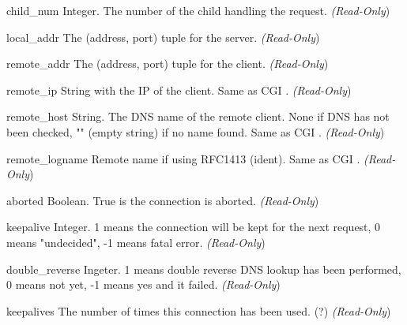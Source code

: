 \begin{memberdesc}[connection]{child_num}
Integer. The number of the child handling the request.
\emph{(Read-Only})
\end{memberdesc}

\begin{memberdesc}[connection]{local_addr}
The (address, port) tuple for the server.
\emph{(Read-Only})
\end{memberdesc}

\begin{memberdesc}[connection]{remote_addr}
The (address, port) tuple for the client.
\emph{(Read-Only})
\end{memberdesc}

\begin{memberdesc}[connection]{remote_ip}
String with the IP of the client. Same as CGI .
\emph{(Read-Only})
\end{memberdesc}

\begin{memberdesc}[connection]{remote_host}
String. The DNS name of the remote client. None if DNS has not been
checked, "" (empty string) if no name found. Same as CGI .
\emph{(Read-Only})
\end{memberdesc}

\begin{memberdesc}[connection]{remote_logname}
Remote name if using RFC1413 (ident). Same as CGI .
\emph{(Read-Only})
\end{memberdesc}

\begin{memberdesc}[connection]{aborted}
Boolean. True is the connection is aborted.
\emph{(Read-Only})
\end{memberdesc}

\begin{memberdesc}[connection]{keepalive}
Integer. 1 means the connection will be kept for the next request, 0 means
"undecided", -1 means fatal error.
\emph{(Read-Only})
\end{memberdesc}

\begin{memberdesc}[connection]{double_reverse}
Ingeter. 1 means double reverse DNS lookup has been performed, 0 means
not yet, -1 means yes and it failed.
\emph{(Read-Only})
\end{memberdesc}

\begin{memberdesc}[connection]{keepalives}
The number of times this connection has been used. (?)
\emph{(Read-Only})
\end{memberdesc}

